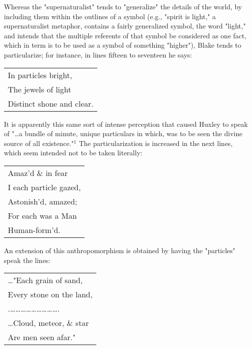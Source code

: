 Whereas the "supernaturalist" tends to "generalize" the details of the world, by
including them within the outlines of a symbol (e.g., "spirit is light," a supernaturalist metaphor,
contains a fairly generalized symbol, the word "light," and intends that the multiple
referents of that symbol be considered as one fact, which in term is to be used as a
symbol of something "higher"), Blake tends to particularize; for instance, in lines fifteen to seventeen he says:\par
\begin{center}
	\parbox{0.8\textwidth}{
		\centering
		\begin{tabular}{l}
			In particles bright, \\
			The jewels of light  \\
			Distinct shone and clear.
		\end{tabular}
	}%
\end{center}
\hspace*{5mm}It is apparently this same sort of intense perception that caused Huxley to speak of
"\dots a bundle of minute, unique particulars in which, was to be seen the divine source
of all existence."$^{1}$ The particularization is increased in the next lines,
which seem intended not to be taken literally:\par
\begin{center}
	\parbox{0.8\textwidth}{
		\centering
		\begin{tabular}{l}
			Amaz'd \& in fear      \\
			I each particle gazed, \\
			Astonish'd, amazed;    \\
			For each was a Man     \\
			Human-form'd.
		\end{tabular}
	}%
\end{center}
\hspace*{5mm}An extension of this anthropomorphism is obtained by having the "particles"
speak the lines:\par
\begin{center}
	\parbox{0.8\textwidth}{
		\centering
		\begin{tabular}{l}
			\dots"Each grain of sand,                       \\
			Every stone on the land,                        \\
			.\dots\dots\dots\dots\dots\dots\dots\dots\dots. \\
			\dots Cloud, meteor, \& star                    \\
			Are men seen afar."
		\end{tabular}
	}%
\end{center}
